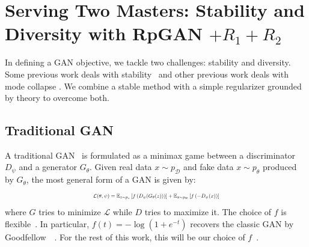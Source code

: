 

\section{Serving Two Masters: Stability and Diversity with RpGAN \texorpdfstring{$+ R_1+R_2$}{R-1R-2}}
\label{sec:loss}

In defining a GAN objective, we tackle two challenges: stability and diversity. Some previous work deals with stability~\cite{sg1,sg2,sg3} and other previous work deals with mode collapse \cite{rgan}. We combine a stable method with a simple regularizer grounded by theory to overcome both.

\vspace{-1ex}
\subsection{Traditional GAN}
\vspace{-1ex}
A traditional GAN~\cite{gan,nowozin2016f} is formulated as a minimax game between a discriminator $D_\psi$ and a generator $G_\theta$. Given real data $x\sim p_\mathcal{D}$ and fake data $x\sim p_\theta$ produced by $G_\theta$, the most general form of a GAN is given by:
\begin{align}
\begin{split}
\label{eq:gan}
\resizebox{0.438\textwidth}{!}{$
\mathcal{L}(\theta,\psi)=\mathbb{E}_{z\sim p_z}\left[f\left(  D_\psi(G_\theta(z))\right)\right]+\mathbb{E}_{x\sim p_\mathcal{D}}\left[f\left( -D_\psi(x) \right)\right]
$}
\end{split}
\end{align}
\noindent where $G$ tries to minimize $\mathcal{L}$ while $D$ tries to maximize it. The choice of $f$ is flexible~\cite{lsgan,hingegan}. In particular, $f(t) = -\log(1+e^{-t})$ recovers the classic GAN by Goodfellow~\etal~\cite{gan}. For the rest of this work, this will be our choice of $f$~\cite{nowozin2016f}.

